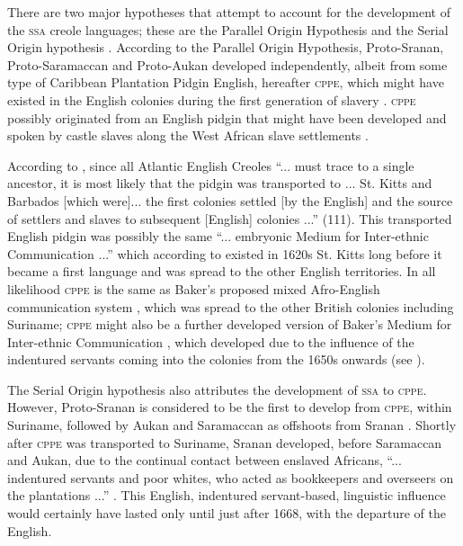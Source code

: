 There are two major hypotheses that attempt to account for the development of the \textsc{ssa}  creole languages; these are the Parallel Origin Hypothesis and the Serial Origin hypothesis \citep{Smith01}. According to the Parallel Origin Hypothesis, Proto-Sranan, Proto-Saramaccan and Proto-Aukan developed independently, albeit from some type of Caribbean Plantation Pidgin English, hereafter \textsc{cppe}, which might have existed in the English colonies during the first generation of slavery  \citep{Smith01, McWhorter98}. \textsc{cppe} possibly originated from an English pidgin that might have been developed and spoken by castle slaves along the West African slave settlements \citep{McWhorter00b}.

According to \citet{McWhorter00b}, since all Atlantic English Creoles ``... must trace to a single ancestor, it is most likely that the pidgin was transported to ... St. Kitts and Barbados [which were]... the first colonies settled [by the English] and the source of settlers and slaves to subsequent [English] colonies ...'' (111). This transported English pidgin was possibly the same ``... embryonic Medium for Inter-ethnic Communication ...'' which according to \citet[347]{Baker98} existed in 1620s St. Kitts long before it became a first language and was spread to the other English territories. In all likelihood \textsc{cppe} is the same as Baker's proposed mixed Afro-English communication system \citep{Baker98}, which was spread to the other British colonies including Suriname; \textsc{cppe} might also be a further developed version of Baker’s Medium for Inter-ethnic Communication \citep{Baker98}, which developed due to the influence of the indentured servants coming into the colonies from the 1650s onwards (see ).

The Serial Origin hypothesis also attributes the development of \textsc{ssa}  to \textsc{cppe}. However, Proto-Sranan is considered to be the first to develop from \textsc{cppe}, within Suriname, followed by Aukan and Saramaccan as offshoots from Sranan \citep{Smith01, McWhorter98}. Shortly after \textsc{cppe} was transported to Suriname, Sranan developed, before Saramaccan and Aukan, due to the continual contact between enslaved Africans, ``... indentured servants and poor whites, who acted as bookkeepers and overseers on the plantations ...'' \citep[xii]{Cassidy67}. This English, indentured servant-based, linguistic influence would certainly have lasted only until just after 1668, with the departure of the English.

